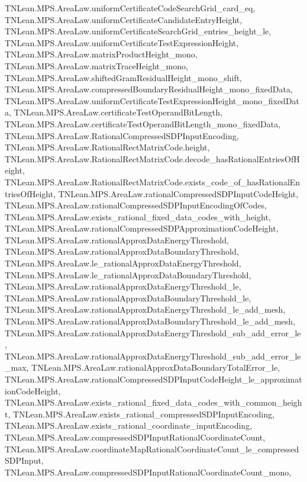 \begin{lemma}
{        TNLean.MPS.AreaLaw.uniformCertificateCodeSearchGrid_card_eq,
        TNLean.MPS.AreaLaw.uniformCertificateCandidateEntryHeight,
        TNLean.MPS.AreaLaw.uniformCertificateSearchGrid_entries_height_le,
        TNLean.MPS.AreaLaw.uniformCertificateTestExpressionHeight,
        TNLean.MPS.AreaLaw.matrixProductHeight_mono,
        TNLean.MPS.AreaLaw.matrixTraceHeight_mono,
        TNLean.MPS.AreaLaw.shiftedGramResidualHeight_mono_shift,
        TNLean.MPS.AreaLaw.compressedBoundaryResidualHeight_mono_fixedData,
        TNLean.MPS.AreaLaw.uniformCertificateTestExpressionHeight_mono_fixedData,
        TNLean.MPS.AreaLaw.certificateTestOperandBitLength,
        TNLean.MPS.AreaLaw.certificateTestOperandBitLength_mono_fixedData,
        TNLean.MPS.AreaLaw.RationalCompressedSDPInputEncoding,
        TNLean.MPS.AreaLaw.RationalRectMatrixCode.height,
        TNLean.MPS.AreaLaw.RationalRectMatrixCode.decode_hasRationalEntriesOfHeight,
        TNLean.MPS.AreaLaw.RationalRectMatrixCode.exists_code_of_hasRationalEntriesOfHeight,
        TNLean.MPS.AreaLaw.rationalCompressedSDPInputCodeHeight,
        TNLean.MPS.AreaLaw.rationalCompressedSDPInputEncodingOfCodes,
        TNLean.MPS.AreaLaw.exists_rational_fixed_data_codes_with_height,
        TNLean.MPS.AreaLaw.rationalCompressedSDPApproximationCodeHeight,
        TNLean.MPS.AreaLaw.rationalApproxDataEnergyThreshold,
        TNLean.MPS.AreaLaw.rationalApproxDataBoundaryThreshold,
        TNLean.MPS.AreaLaw.le_rationalApproxDataEnergyThreshold,
        TNLean.MPS.AreaLaw.le_rationalApproxDataBoundaryThreshold,
        TNLean.MPS.AreaLaw.rationalApproxDataEnergyThreshold_le,
        TNLean.MPS.AreaLaw.rationalApproxDataBoundaryThreshold_le,
        TNLean.MPS.AreaLaw.rationalApproxDataEnergyThreshold_le_add_mesh,
        TNLean.MPS.AreaLaw.rationalApproxDataBoundaryThreshold_le_add_mesh,
        TNLean.MPS.AreaLaw.rationalApproxDataEnergyThreshold_sub_add_error_le,
        TNLean.MPS.AreaLaw.rationalApproxDataEnergyThreshold_sub_add_error_le_max,
        TNLean.MPS.AreaLaw.rationalApproxDataBoundaryTotalError_le,
        TNLean.MPS.AreaLaw.rationalCompressedSDPInputCodeHeight_le_approximationCodeHeight,
        TNLean.MPS.AreaLaw.exists_rational_fixed_data_codes_with_common_height,
        TNLean.MPS.AreaLaw.exists_rational_compressedSDPInputEncoding,
        TNLean.MPS.AreaLaw.exists_rational_coordinate_inputEncoding,
        TNLean.MPS.AreaLaw.compressedSDPInputRationalCoordinateCount,
        TNLean.MPS.AreaLaw.coordinateMapRationalCoordinateCount_le_compressedSDPInput,
        TNLean.MPS.AreaLaw.compressedSDPInputRationalCoordinateCount_mono,
}
\end{lemma}
